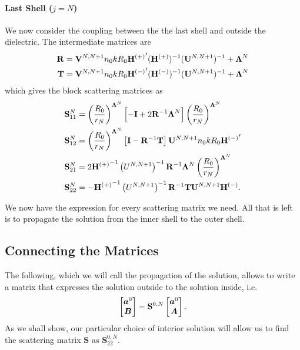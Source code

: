 \paragraph{Last Shell ($j=N$)}
We now consider the coupling between the 
the last shell and outside the dielectric. The 
intermediate matrices are
  \begin{subequations}
  \begin{align}
   \mathbf{R}	&= \mathbf{V}^{N,N+1}n_0kR_0{\mathbf{H}^{(+)}}'(\mathbf{H}^{(+)})^{-1}(\mathbf{U}^{N,N+1})^{-1}+\boldsymbol{\Lambda}^N	\\
   \mathbf{T}	&= \mathbf{V}^{N,N+1}n_0kR_0{\mathbf{H}^{(-)}}'(\mathbf{H}^{(-)})^{-1}(\mathbf{U}^{N,N+1})^{-1}+\boldsymbol{\Lambda}^N
  \end{align}
  \end{subequations}
which gives the block scattering matrices as
  \begin{subequations}
  \begin{align}
    \mathbf{S}^N_{11}	&= \left(\frac{R_0}{r_N}\right)^{\boldsymbol{\Lambda}^N}\left[-\mathbf{I}+2\mathbf{R}^{-1}\boldsymbol{\Lambda}^N\right]\left(\frac{R_0}{r_N}\right)^{\boldsymbol{\Lambda}^N}	\\
    \mathbf{S}^N_{12}	&= \left(\frac{R_0}{r_N}\right)^{\boldsymbol{\Lambda}^N}\left[\mathbf{I}-\mathbf{R}^{-1}\mathbf{T}\right]\mathbf{U}^{N,N+1}n_0kR_0{\mathbf{H}^{(-)}}'		\\
    \mathbf{S}^N_{21}	&= 2{\mathbf{H}^{(+)}}^{-1}\left(U^{N,N+1}\right)^{-1}\mathbf{R}^{-1}\boldsymbol{\Lambda}^N\left(\frac{R_0}{r_N}\right)^{\boldsymbol{\Lambda}^N}				\\
    \mathbf{S}^N_{22}	&= -{\mathbf{H}^{(+)}}^{-1}\left(U^{N,N+1}\right)^{-1}\mathbf{R}^{-1}\mathbf{T}\mathbf{U}^{N,N+1}\mathbf{H}^{(-)}.
  \end{align}
  \end{subequations}

We now have the expression for every scattering matrix we need.
All that is left is to propagate the solution from the inner shell
to the outer shell. 

\subsection{Connecting the Matrices}
The following, which we will call the propagation
of the solution, allows to write a matrix that 
expresses the solution outside to the solution inside, i.e.
  \begin{equation}
   \begin{bmatrix} \boldsymbol{a}^0 \\ \boldsymbol{B} \end{bmatrix} = \mathbf{S}^{0,N}\begin{bmatrix} \boldsymbol{a}^0 \\ \boldsymbol{A} \end{bmatrix}.
  \end{equation}
As we shall show, our particular choice of interior solution will allow
us to find the scattering matrix $\mathbf{S}$ as $\mathbf{S}^{0,N}_{22}$. 


